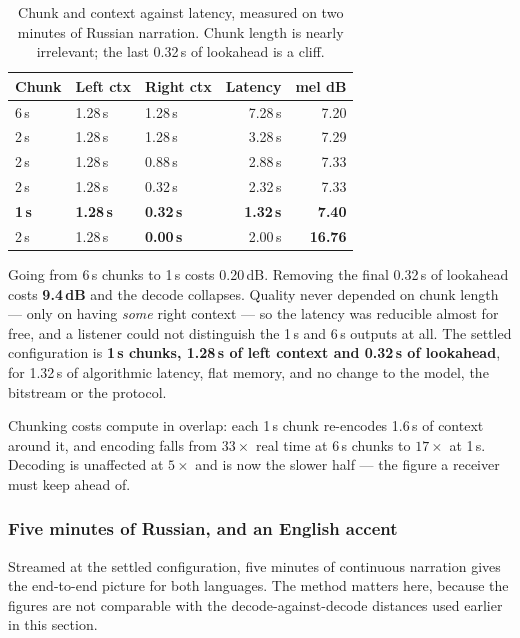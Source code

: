 \begin{table}[H]
    \centering
    \caption{Chunk and context against latency, measured on two minutes
             of Russian narration.  Chunk length is nearly irrelevant;
             the last 0.32\,s of lookahead is a cliff.}
    \label{tab:voice_latency}
    \small
    \begin{tabular}{@{}lllrr@{}}
    \toprule
    \textbf{Chunk} & \textbf{Left ctx} & \textbf{Right ctx} &
    \textbf{Latency} & \textbf{mel dB} \\
    \midrule
    6\,s & 1.28\,s & 1.28\,s & 7.28\,s &  7.20 \\
    2\,s & 1.28\,s & 1.28\,s & 3.28\,s &  7.29 \\
    2\,s & 1.28\,s & 0.88\,s & 2.88\,s &  7.33 \\
    2\,s & 1.28\,s & 0.32\,s & 2.32\,s &  7.33 \\
    \textbf{1\,s} & \textbf{1.28\,s} & \textbf{0.32\,s} &
        \textbf{1.32\,s} & \textbf{7.40} \\
    2\,s & 1.28\,s & \textbf{0.00\,s} & 2.00\,s & \textbf{16.76} \\
    \bottomrule
    \end{tabular}
\end{table}

Going from 6\,s chunks to 1\,s costs 0.20\,dB.  Removing the final
0.32\,s of lookahead costs \textbf{9.4\,dB} and the decode collapses.
Quality never depended on chunk length --- only on having \emph{some}
right context --- so the latency was reducible almost for free, and a
listener could not distinguish the 1\,s and 6\,s outputs at all.  The
settled configuration is \textbf{1\,s chunks, 1.28\,s of left context
and 0.32\,s of lookahead}, for 1.32\,s of algorithmic latency, flat
memory, and no change to the model, the bitstream or the protocol.

Chunking costs compute in overlap: each 1\,s chunk re-encodes 1.6\,s of
context around it, and encoding falls from $33\times$ real time at 6\,s
chunks to $17\times$ at 1\,s.  Decoding is unaffected at $5\times$ and is
now the slower half --- the figure a receiver must keep ahead of.

\subsubsection{Five minutes of Russian, and an English accent}
\label{sec:voice_russian}

Streamed at the settled configuration, five minutes of continuous
narration gives the end-to-end picture for both languages.  The method
matters here, because the figures are not comparable with the
decode-against-decode distances used earlier in this section.

